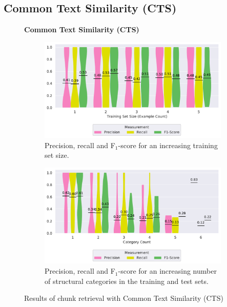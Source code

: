 \subsection{Common Text Similarity (CTS)}
\label{sec:r:cts}
\begin{figure}
\centering
    \textbf{Common Text Similarity (CTS)}\par\medskip
\begin{subfigure}[t]{\columnwidth}
		\centering
                \includegraphics[width=\columnwidth, clip]{img/big-study/recall-precision-examplecount-CTS.pdf}
		\caption{Precision, recall and F$_{1}$-score for an increasing training set size.}
		\label{fig:recall-precision-examplecount-CTS}
                
\end{subfigure}\hspace{\fill}
\begin{subfigure}[t]{\columnwidth}
		\centering
                		\includegraphics[width=\columnwidth, clip]{img/big-study/recall-precision-categorycount-CTS.pdf}
		\caption{Precision, recall and F$_{1}$-score for an increasing number of structural categories in the training and test sets.}
		\label{fig:recall-precision-categorycount-CTS}
\end{subfigure}
\caption{Results of chunk retrieval with Common Text Similarity (CTS)}
\end{figure}

